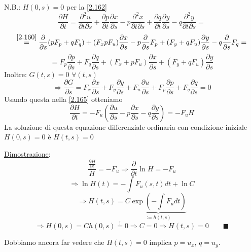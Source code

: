 \documentclass[a4paper,11pt]{report}
\begin{document}
N.B.: $H(0,s)=0$ per la \eqref{2.162}
\[
\frac{\partial H}{\partial t} = \frac{\partial^2 u}{\partial t \partial s} + \frac{\partial p}{\partial t}\frac{\partial x}{\partial s} - p\frac{\partial^2 x}{\partial t \partial s} + \frac{\partial q}{\partial t}\frac{\partial y}{\partial s} - q\frac{\partial^2 y}{\partial t \partial s}=
\]
\[
\overset{\eqref{2.160}}{=} \frac{\partial}{\partial s}(pF_p + qF_q) + (F_x pF_u)\frac{\partial x}{\partial s} - p\frac{\partial}{\partial s}F_p + (F_y + qF_u)\frac{\partial y}{\partial s} - q \frac{\partial}{\partial s} F_q =
\]
\begin{equation}
=F_p \frac{\partial p}{\partial s} + F_q \frac{\partial q}{\partial s} + (F_x + pF_u)\frac{\partial x}{\partial s} + (F_y + qF_u)\frac{\partial y}{\partial s}
\label{2.165}
\end{equation}
Inoltre: $G(t,s)=0$ $\forall (t,s)$
\[
\Rightarrow \frac{\partial G}{\partial s }=F_x \frac{\partial x}{\partial s} + F_y \frac{\partial y}{\partial s} + F_u \frac{\partial u}{\partial s} + F_p\frac{\partial p}{\partial s} + F_q \frac{\partial q}{ \partial s}=0
\]
Usando questa nella \eqref{2.165} otteniamo
\[
\frac{\partial H}{\partial t} = - F_u\left(\frac{\partial u}{\partial s} - p\frac{\partial x}{\partial s} - q\frac{\partial y}{\partial s}\right)=-F_u H
\]
La soluzione di questa equazione differenziale ordinaria con condizione iniziale $H(0,s)=0$ \`e $H(t,s)=0$

\medskip

\underline{Dimostrazione}:
\[
\frac{\frac{\partial H}{\partial t}}{H}=-F_u \Rightarrow \frac{\partial}{\partial t}\ln H = -F_u
\]
\[
\Rightarrow \ln H(t) = -\int F_u(s,t)dt + \ln C
\]
\[
\Rightarrow H(t,s)=C \underbrace{\exp \left(-\int F_u dt\right)}_{:=h(t,s)}
\]
\[
\Rightarrow H(0,s)= C h(0,s) \overset{!}{=}0 \Rightarrow C=0 \Rightarrow H(t,s)=0 \qquad \blacksquare
\]

\medskip

Dobbiamo ancora far vedere che $H(t,s)=0$ implica $p=u_x$, $q=u_y$. 
\end{document}
